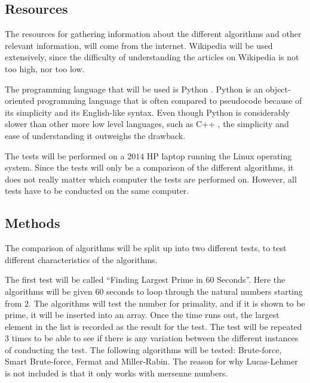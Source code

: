 \documentclass[main.tex]{subfiles}
\begin{document}
\subsection{Resources}

The resources for gathering information about the different algorithms and other
relevant information, will come from the internet. Wikipedia \cite{wikipedia}
will be used extensively, since the difficulty of understanding the articles on
Wikipedia is not too high, nor too low. \newline

The programming language that will be used is Python \cite{python}. Python is an
object-oriented programming language that is often compared to pseudocode
because of its simplicity and its English-like syntax. Even though Python is
considerably slower \cite{pythonvscpp} than other more low level languages,
such as C++ \cite{cpp}, the simplicity and ease of understanding it outweighs
the drawback. \newline

The tests will be performed on a $2014$ HP laptop running the Linux operating
system. Since the tests will only be a comparison of the different algorithms,
it does not really matter which computer the tests are performed on. However, all
tests have to be conducted on the same computer.

\subsection{Methods}
The comparison of algorithms will be split up into two different tests, to test
different characteristics of the algorithms. \newline

The first test will be called ``Finding Largest Prime in 60 Seconds''. Here
the algorithms will be given $60$ seconds to loop through the natural numbers
starting from $2$. The algorithms will test the number for primality, and if it
is shown to be prime, it will be inserted into an array. Once the time runs out,
the largest element in the list is recorded as the result for the test. The test
will be repeated $3$ times to be able to see if there is any variation between
the different instances of conducting the test. The following algorithms will be
tested: Brute-force, Smart Brute-force, Fermat and Miller-Rabin. The reason for
why Lucas-Lehmer is not included is that it only works with mersenne numbers.
\newline
\end{document}
